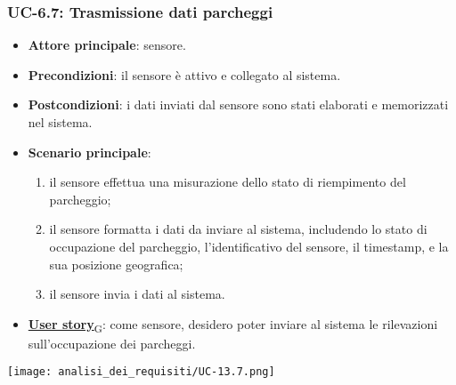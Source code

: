 \subsubsection{UC-6.7: Trasmissione dati parcheggi}
\begin{itemize}
	\item \textbf{Attore principale}: sensore.
	\item \textbf{Precondizioni}: il sensore è attivo e collegato al sistema.
	\item \textbf{Postcondizioni}: i dati inviati dal sensore sono stati elaborati e memorizzati nel sistema.
	\item \textbf{Scenario principale}:
	      \begin{enumerate}
		      \item il sensore effettua una misurazione dello stato di riempimento del parcheggio;
		      \item il sensore formatta i dati da inviare al sistema, includendo lo stato di occupazione del parcheggio, l'identificativo del sensore,
		            il timestamp, e la sua posizione geografica;
		      \item il sensore invia i dati al sistema.
	      \end{enumerate}
	\item \href{https://7last.github.io/docs/rtb/documentazione-interna/glossario\#user-story}{\textbf{User story}\textsubscript{G}}:
	      come sensore, desidero poter inviare al sistema le rilevazioni sull'occupazione dei parcheggi.
\end{itemize}

\begin{center}
	\texttt{[image: analisi\_dei\_requisiti/UC-13.7.png]}
\end{center}

